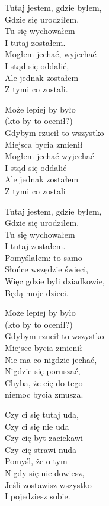 \begin{text}
    \begin{footTwelve}
    Tutaj jestem, gdzie byłem,\\
    Gdzie się urodziłem.\\
    Tu się wychowałem\\
    I tutaj zostałem.\\
    Mogłem jechać, wyjechać\\
    I stąd się oddalić,\\
    Ale jednak zostałem\\
    Z tymi co zostali.

    \vin Może lepiej by było\\
    \vin (kto by to ocenił?)\\
    \vin Gdybym rzucił to wszystko\\
    \vin Miejsca bycia zmienił\\
    \vin Mogłem jechać wyjechać\\
    \vin I stąd się oddalić\\
    \vin Ale jednak zostałem\\
    \vin Z tymi co zostali

    Tutaj jestem, gdzie byłem,\\
    Gdzie się urodziłem.\\
    Tu się wychowałem\\
    I tutaj zostałem.\\
    Pomyślałem: to samo\\
    Słońce wszędzie świeci,\\
    Więc gdzie byli dziadkowie,\\
    Będą moje dzieci.

    \vin Może lepiej by było\\
    \vin (kto by to ocenił?)\\
    \vin Gdybym rzucił to wszystko\\
    \vin Miejsce bycia zmienił\\
    \vin Nie ma co nigdzie jechać,\\
    \vin Nigdzie się poruszać,\\
    \vin Chyba, że cię do tego\\
    \vin niemoc bycia zmusza.

    Czy ci się tutaj uda,\\
    Czy ci się nie uda\\
    Czy cię byt zaciekawi\\
    Czy cię strawi nuda –\\
    Pomyśl, że o tym\\
    Nigdy się nie dowiesz,\\
    Jeśli zostawisz wszystko\\
    I pojedziesz sobie.


\end{footTwelve}
\end{text}
